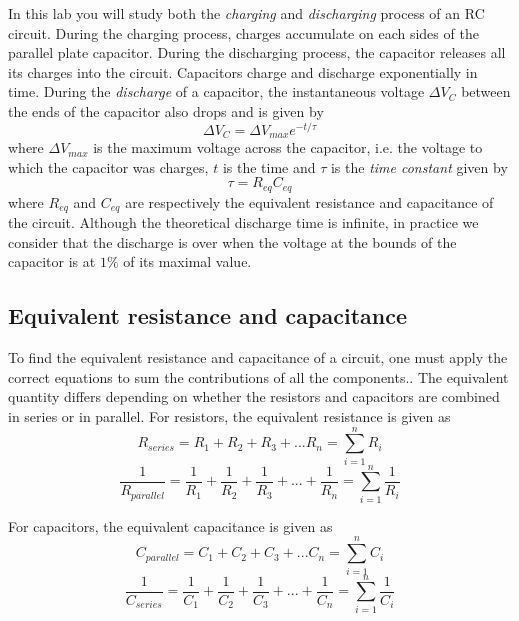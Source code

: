 \documentclass[12pt]{report}
\begin{document}
In this lab you will study both the \textit{charging} and \textit{discharging} process of an RC circuit. During the charging process, charges accumulate on each sides of the parallel plate capacitor. During the discharging process, the capacitor releases all its charges into the circuit. Capacitors charge and discharge exponentially in time. During the \textit{discharge} of a capacitor, the instantaneous voltage $\Delta V_C$ between the ends of the capacitor also drops and is given by
\begin{equation}
\Delta V_C = \Delta V_{max} e^{-t/\tau}
\label{Eq:V-discharge}
\end{equation}
where $\Delta V_{max}$ is the maximum voltage across the capacitor, i.e. the voltage to which the capacitor was charges, $t$ is the time and $\tau$ is the \textit{time constant} given by
\begin{equation}
\tau = R_{eq} C_{eq}
\label{Eq:time-constant}
\end{equation}
where $R_{eq}$ and $C_{eq}$ are respectively the equivalent resistance and capacitance of the circuit. Although the theoretical discharge time is infinite, in practice we consider that the discharge is over when the voltage at the bounds of the capacitor is at $1\%$ of its maximal value. 

\subsection{Equivalent resistance and capacitance}
To find the equivalent resistance and capacitance of a circuit, one must apply the correct equations to sum the contributions of all the components.. The equivalent quantity differs depending on whether the resistors and capacitors are combined in series or in parallel. For resistors, the equivalent resistance is given as
\begin{equation}
R_{series} = R_1 + R_2 + R_3 + ... R_n = \displaystyle \sum_{i=1}^n R_i
\end{equation}
\begin{equation}
\frac{1}{R_{parallel}} = \frac{1}{R_1} + \frac{1}{R_2} + \frac{1}{R_3} + ... + \frac{1}{R_n} = \displaystyle \sum_{i=1}^n \frac{1}{R_i}
\end{equation}

For capacitors, the equivalent capacitance is given as
\begin{equation}
C_{parallel} = C_1 + C_2 + C_3 + ... C_n = \displaystyle \sum_{i=1}^n C_i
\end{equation}
\begin{equation}
\frac{1}{C_{series}} =  \frac{1}{C_1} + \frac{1}{C_2} + \frac{1}{C_3} + ... + \frac{1}{C_n} = \displaystyle  \sum_{i=1}^n \frac{1}{C_i}
\end{equation}
\end{document}
